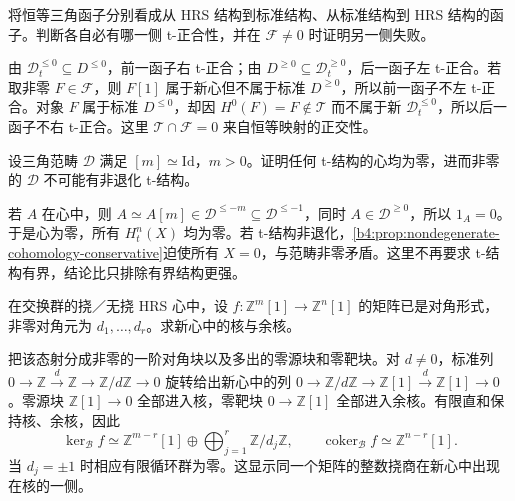 \begin{exercise}\label{b4:ex:19-identity-one-sided-t}
	将恒等三角函子分别看成从 HRS 结构到标准结构、从标准结构到 HRS 结构的函子。判断各自必有哪一侧 t-正合性，并在 \(\mathcal F\ne0\) 时证明另一侧失败。
\end{exercise}
\begin{solution}
	由 \(\mathcal D_t^{\le0}\subseteq D^{\le0}\)，前一函子右 t-正合；由 \(D^{\ge0}\subseteq\mathcal D_t^{\ge0}\)，后一函子左 t-正合。若取非零 \(F\in\mathcal F\)，则 \(F[1]\) 属于新心但不属于标准 \(D^{\ge0}\)，所以前一函子不左 t-正合。对象 \(F\) 属于标准 \(D^{\le0}\)，却因 \(H^0(F)=F\notin\mathcal T\) 而不属于新 \(\mathcal D_t^{\le0}\)，所以后一函子不右 t-正合。这里 \(\mathcal T\cap\mathcal F=0\) 来自恒等映射的正交性。
\end{solution}

\begin{exercise}\label{b4:ex:19-periodic-heart-zero}
	设三角范畴 \(\mathcal D\) 满足 \([m]\simeq\mathrm{Id}\)，\(m>0\)。证明任何 t-结构的心均为零，进而非零的 \(\mathcal D\) 不可能有非退化 t-结构。
\end{exercise}
\begin{solution}
	若 \(A\) 在心中，则 \(A\simeq A[m]\in\mathcal D^{\le-m}\subseteq\mathcal D^{\le-1}\)，同时 \(A\in\mathcal D^{\ge0}\)，所以 \(1_A=0\)。于是心为零，所有 \(H_t^n(X)\) 均为零。若 t-结构非退化，\cref{b4:prop:nondegenerate-cohomology-conservative}迫使所有 \(X=0\)，与范畴非零矛盾。这里不再要求 t-结构有界，结论比只排除有界结构更强。
\end{solution}

\begin{exercise}\label{b4:ex:19-diagonal-matrix-new-kernel}
	在交换群的挠／无挠 HRS 心中，设 \(f:\mathbb Z^m[1]\to\mathbb Z^n[1]\) 的矩阵已是对角形式，非零对角元为 \(d_1,\ldots,d_r\)。求新心中的核与余核。
\end{exercise}
\begin{solution}
	把该态射分成非零的一阶对角块以及多出的零源块和零靶块。对 \(d\ne0\)，标准列 \(0\to\mathbb Z\xrightarrow{d}\mathbb Z\to\mathbb Z/d\mathbb Z\to0\) 旋转给出新心中的列 \(0\to\mathbb Z/d\mathbb Z\to\mathbb Z[1]\xrightarrow{d}\mathbb Z[1]\to0\)。零源块 \(\mathbb Z[1]\to0\) 全部进入核，零靶块 \(0\to\mathbb Z[1]\) 全部进入余核。有限直和保持核、余核，因此
	\[
		\ker_{\mathcal B}f\simeq\mathbb Z^{m-r}[1]\oplus \bigoplus_{j=1}^r\mathbb Z/d_j\mathbb Z, \qquad \operatorname{coker}_{\mathcal B}f\simeq\mathbb Z^{n-r}[1].
	\]
	当 \(d_j=\pm1\) 时相应有限循环群为零。这显示同一个矩阵的整数挠商在新心中出现在核的一侧。
\end{solution}

